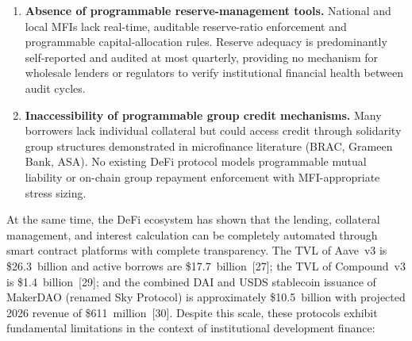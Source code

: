 \documentclass[12pt,a4paper]{report}
\begin{document}
\begin{enumerate}[noitemsep]
\item \textbf{Absence of programmable reserve-management tools.} National and local MFIs lack real-time, auditable reserve-ratio enforcement and programmable capital-allocation rules. Reserve adequacy is predominantly self-reported and audited at most quarterly, providing no mechanism for wholesale lenders or regulators to verify institutional financial health between audit cycles.

\item \textbf{Inaccessibility of programmable group credit mechanisms.} Many borrowers lack individual collateral but could access credit through solidarity group structures demonstrated in microfinance literature (BRAC, Grameen Bank, ASA). No existing DeFi protocol models programmable mutual liability or on-chain group repayment enforcement with MFI-appropriate stress sizing.
\end{enumerate}

At the same time, the DeFi ecosystem has shown that the lending, collateral management, and interest calculation can be completely automated through smart contract platforms with complete transparency. The TVL of Aave~v3 is \$26.3~billion and active borrows are \$17.7~billion~[27]; the TVL of Compound~v3 is \$1.4~billion~[29]; and the combined DAI and USDS stablecoin issuance of MakerDAO (renamed Sky Protocol) is approximately \$10.5~billion with projected 2026 revenue of \$611~million~[30]. Despite this scale, these protocols exhibit fundamental limitations in the context of institutional development finance:
\end{document}
